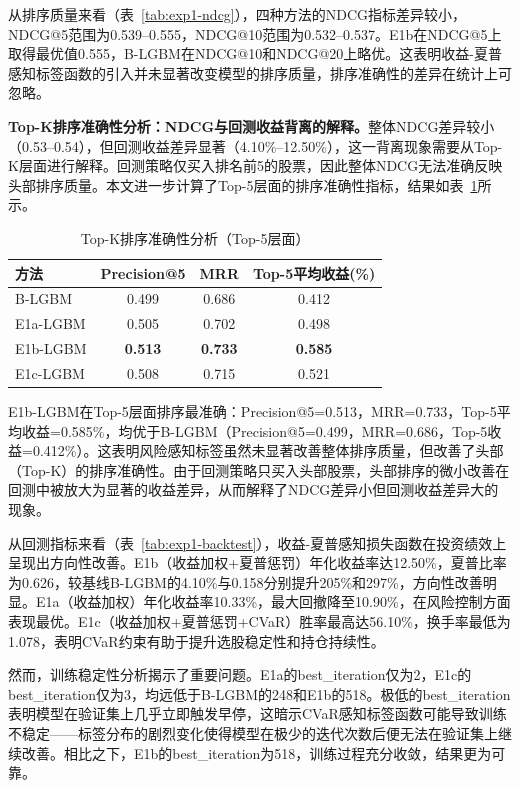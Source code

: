 \documentclass[11pt,a4paper]{ctexart}
\newcommand{\best}[1]{\textcolor{bestval}{\textbf{#1}}}
\begin{document}
从排序质量来看（表~\ref{tab:exp1-ndcg}），四种方法的NDCG指标差异较小，NDCG@5范围为0.539--0.555，NDCG@10范围为0.532--0.537。E1b在NDCG@5上取得最优值0.555，B-LGBM在NDCG@10和NDCG@20上略优。这表明收益-夏普感知标签函数的引入并未显著改变模型的排序质量，排序准确性的差异在统计上可忽略。

\textbf{Top-K排序准确性分析：NDCG与回测收益背离的解释。}整体NDCG差异较小（0.53--0.54），但回测收益差异显著（4.10\%--12.50\%），这一背离现象需要从Top-K层面进行解释。回测策略仅买入排名前5的股票，因此整体NDCG无法准确反映头部排序质量。本文进一步计算了Top-5层面的排序准确性指标，结果如表~\ref{tab:topk-accuracy}所示。

\begin{table}[htbp]
\centering
\caption{Top-K排序准确性分析（Top-5层面）}
\label{tab:topk-accuracy}
\begin{tabular}{lccc}
\toprule
\textbf{方法} & \textbf{Precision@5} & \textbf{MRR} & \textbf{Top-5平均收益(\%)} \\
\midrule
B-LGBM  & 0.499 & 0.686 & 0.412 \\
E1a-LGBM & 0.505 & 0.702 & 0.498 \\
E1b-LGBM & \best{0.513} & \best{0.733} & \best{0.585} \\
E1c-LGBM & 0.508 & 0.715 & 0.521 \\
\bottomrule
\end{tabular}
\end{table}

E1b-LGBM在Top-5层面排序最准确：Precision@5=0.513，MRR=0.733，Top-5平均收益=0.585\%，均优于B-LGBM（Precision@5=0.499，MRR=0.686，Top-5收益=0.412\%）。这表明风险感知标签虽然未显著改善整体排序质量，但改善了头部（Top-K）的排序准确性。由于回测策略只买入头部股票，头部排序的微小改善在回测中被放大为显著的收益差异，从而解释了NDCG差异小但回测收益差异大的现象。

从回测指标来看（表~\ref{tab:exp1-backtest}），收益-夏普感知损失函数在投资绩效上呈现出方向性改善。E1b（收益加权+夏普惩罚）年化收益率达12.50\%，夏普比率为0.626，较基线B-LGBM的4.10\%与0.158分别提升205\%和297\%，方向性改善明显。E1a（收益加权）年化收益率10.33\%，最大回撤降至10.90\%，在风险控制方面表现最优。E1c（收益加权+夏普惩罚+CVaR）胜率最高达56.10\%，换手率最低为1.078，表明CVaR约束有助于提升选股稳定性和持仓持续性。

然而，训练稳定性分析揭示了重要问题。E1a的best\_iteration仅为2，E1c的best\_iteration仅为3，均远低于B-LGBM的248和E1b的518。极低的best\_iteration表明模型在验证集上几乎立即触发早停，这暗示CVaR感知标签函数可能导致训练不稳定——标签分布的剧烈变化使得模型在极少的迭代次数后便无法在验证集上继续改善。相比之下，E1b的best\_iteration为518，训练过程充分收敛，结果更为可靠。
\end{document}
